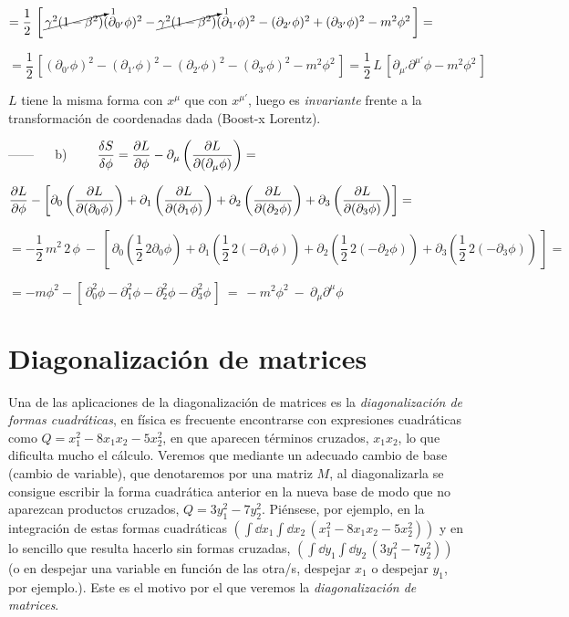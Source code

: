 $=\dfrac 1 2 \, \left[ \,
\cancelto{1}{\gamma^2(1-\beta^2)}(\partial_{0'}\phi)^2
-\cancelto{1}{\gamma^2(1-\beta^2)}(\partial_{1'}\phi)^2
-(\partial_{2'}\phi)^2+(\partial_{3'}\phi)^2-m^2\phi^2
\, \right]=$

$=\dfrac 1 2 \, \left[ (\partial_{0'}\phi)^2-(\partial_{1'}\phi)^2-(\partial_{2'}\phi)^2-(\partial_{3'}\phi)^2-m^2\phi^2 \, \right] = \dfrac 1 2 \, L \, \left[ \partial_{\mu'} \partial^{\mu'}\phi - m^2 \phi^2 \, \right] $


$L$ tiene la misma forma con $x^\mu$ que con $x^{\mu'}$, luego es \emph{invariante} frente a la transformación de coordenadas dada (Boost-x Lorentz).

\vspace{5mm}

------ $\quad$ b)
$ \qquad \displaystyle \fdv{S}{\phi}=\pdv{L}{\phi}-\partial_\mu \left( \pdv{L}{(\partial_\mu \phi)} \right)=$ \begin{small}$\displaystyle \pdv{L}{\phi}- \left[
\partial_0 \left( \pdv{L}{(\partial_0 \phi)} \right)+
\partial_1 \left( \pdv{L}{(\partial_1 \phi)} \right)+
\partial_2 \left( \pdv{L}{(\partial_2 \phi)} \right)+
\partial_3 \left( \pdv{L}{(\partial_3 \phi)} \right)
\right]=$\end{small}

$\displaystyle = -\dfrac 1 2 \, m^2 \, 2 \, \phi \ - \ \left[ \,
\partial_0 \left( \dfrac 1 2 \, 2 \partial_0 \phi \right) +
\partial_1 \left( \dfrac 1 2 \, 2 (-\partial_1 \phi ) \right) +
\partial_2 \left( \dfrac 1 2 \, 2 (-\partial_2 \phi ) \right) +
\partial_3 \left( \dfrac 1 2 \, 2 (-\partial_3 \phi ) \right)
\, \right]=$

$=\displaystyle -m\phi^2-[\, \partial_0^2\phi -  \partial_1^2\phi  -  \partial_2^2\phi  -  \partial_3^2\phi  \, ]\ = \ -m^2\phi^2 \ - \ \partial_\mu \partial^\mu \phi$

\color{black}



\chapter{Diagonalización de matrices}
\label{ApendiceDiagonalizacion}

\normalsize 
Una de las aplicaciones de la diagonalización de matrices es la \emph{diagonalización de formas cuadráticas}, en física es frecuente encontrarse con expresiones cuadráticas como $Q= x_1^2-8x_1x_2-5x_2^2$, en que aparecen términos cruzados, $x_1 x_2$, lo que dificulta mucho el cálculo. Veremos que mediante un adecuado cambio de base (cambio de variable), que denotaremos por una matriz $M$, al diagonalizarla se consigue escribir la forma cuadrática anterior en la nueva base de modo que no aparezcan productos cruzados, $Q=3y_1^2-7y_2^2$. Piénsese, por ejemplo, en la integración de estas formas cuadráticas $ \left( \int \dd x_1 \int \dd x_2 \, ( x_1^2-8x_1x_2-5x_2^2 ) \right)$ y en lo sencillo que resulta hacerlo sin formas cruzadas, $\left( \int \dd y_1 \int \dd y_2 \, ( 3y_1^2-7y_2^2 ) \right)$  (o en despejar una variable en función de las otra/s, despejar $x_1$ o despejar $y_1$, por ejemplo.).  Este es el motivo por el que veremos la \emph{diagonalización de matrices}.

